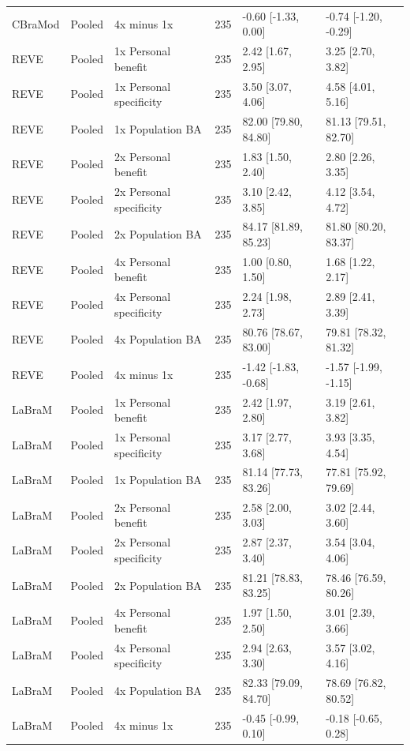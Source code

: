 \begin{longtable}{p{.65in}p{.60in}p{1.9in}rp{1.20in}p{1.20in}}
CBraMod & Pooled & 4x minus 1x & 235 & -0.60 [-1.33, 0.00] & -0.74 [-1.20, -0.29] \\
REVE & Pooled & 1x Personal benefit & 235 & 2.42 [1.67, 2.95] & 3.25 [2.70, 3.82] \\
REVE & Pooled & 1x Personal specificity & 235 & 3.50 [3.07, 4.06] & 4.58 [4.01, 5.16] \\
REVE & Pooled & 1x Population BA & 235 & 82.00 [79.80, 84.80] & 81.13 [79.51, 82.70] \\
REVE & Pooled & 2x Personal benefit & 235 & 1.83 [1.50, 2.40] & 2.80 [2.26, 3.35] \\
REVE & Pooled & 2x Personal specificity & 235 & 3.10 [2.42, 3.85] & 4.12 [3.54, 4.72] \\
REVE & Pooled & 2x Population BA & 235 & 84.17 [81.89, 85.23] & 81.80 [80.20, 83.37] \\
REVE & Pooled & 4x Personal benefit & 235 & 1.00 [0.80, 1.50] & 1.68 [1.22, 2.17] \\
REVE & Pooled & 4x Personal specificity & 235 & 2.24 [1.98, 2.73] & 2.89 [2.41, 3.39] \\
REVE & Pooled & 4x Population BA & 235 & 80.76 [78.67, 83.00] & 79.81 [78.32, 81.32] \\
REVE & Pooled & 4x minus 1x & 235 & -1.42 [-1.83, -0.68] & -1.57 [-1.99, -1.15] \\
LaBraM & Pooled & 1x Personal benefit & 235 & 2.42 [1.97, 2.80] & 3.19 [2.61, 3.82] \\
LaBraM & Pooled & 1x Personal specificity & 235 & 3.17 [2.77, 3.68] & 3.93 [3.35, 4.54] \\
LaBraM & Pooled & 1x Population BA & 235 & 81.14 [77.73, 83.26] & 77.81 [75.92, 79.69] \\
LaBraM & Pooled & 2x Personal benefit & 235 & 2.58 [2.00, 3.03] & 3.02 [2.44, 3.60] \\
LaBraM & Pooled & 2x Personal specificity & 235 & 2.87 [2.37, 3.40] & 3.54 [3.04, 4.06] \\
LaBraM & Pooled & 2x Population BA & 235 & 81.21 [78.83, 83.25] & 78.46 [76.59, 80.26] \\
LaBraM & Pooled & 4x Personal benefit & 235 & 1.97 [1.50, 2.50] & 3.01 [2.39, 3.66] \\
LaBraM & Pooled & 4x Personal specificity & 235 & 2.94 [2.63, 3.30] & 3.57 [3.02, 4.16] \\
LaBraM & Pooled & 4x Population BA & 235 & 82.33 [79.09, 84.70] & 78.69 [76.82, 80.52] \\
LaBraM & Pooled & 4x minus 1x & 235 & -0.45 [-0.99, 0.10] & -0.18 [-0.65, 0.28] \\

\end{longtable}
